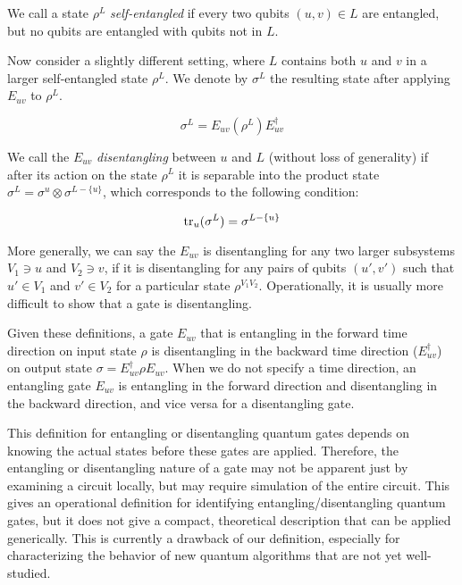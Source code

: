 We call a state $\rho^{L}$ \emph{self-entangled} if every two qubits
$(u,v) \in L$ are entangled, but no qubits are entangled with qubits
not in $L$.

Now consider a slightly different setting, where $L$ contains both $u$ and $v$
in a larger self-entangled state $\rho^{L}$. We denote by $\sigma^{L}$ the resulting
state after applying $E_{uv}$ to $\rho^{L}$.

\begin{equation}
\sigma^{L} = E_{uv} (\rho^{L}) E^{\dagger}_{uv}
\end{equation}

We call the $E_{uv}$ \emph{disentangling} between $u$ and $L$ (without loss
of generality) if after its action on the state $\rho^{L}$ it is
separable into the product state $\sigma^{L} = \sigma^{u} \otimes \sigma^{L - \{u\}}$,
which corresponds to the following condition:

\begin{equation}
\text{tr}_{u}(\sigma^{L}) = \sigma^{L - \{u\}}
\end{equation}

More generally, we can say the $E_{uv}$ is disentangling for any two
larger subsystems $V_1 \ni u$ and $V_2 \ni v$, if it is disentangling
for any pairs of qubits $(u',v')$ such that $u' \in V_1$ and $v' \in V_2$
for a particular state $\rho^{V_1 V_2}$.
Operationally, it is
usually more difficult to show that a gate is disentangling.

Given these definitions, a gate $E_{uv}$
that is entangling in the forward time direction on input state $\rho$
is disentangling in the backward time direction ($E^{\dagger}_{uv}$) on output
state $\sigma = E^{\dagger}_{uv}\rho E_{uv}$. When we do not specify a
time direction, an entangling gate $E_{uv}$ is entangling in the forward
direction and disentangling in the backward direction, and vice versa
for a disentangling gate.

This definition for entangling or disentangling quantum gates
depends on knowing the actual states before these gates are applied.
Therefore, the entangling or disentangling nature of a gate
may not be apparent just by examining a circuit locally,
but may require simulation of the entire circuit. This gives an operational
definition for identifying entangling/disentangling quantum gates, but it does not give
a compact, theoretical description that can be applied generically. This is
currently a drawback of our definition, especially for characterizing the
behavior of new quantum algorithms that are not yet well-studied.

